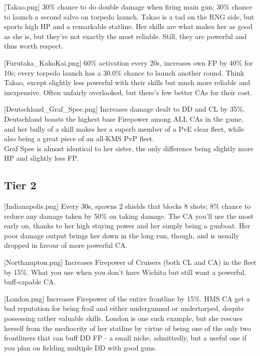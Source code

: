 [Takao.png]
{30\% chance to do double damage when firing main gun; 30\% chance to launch a second salvo on torpedo launch.}
{}
{Takao is a tad on the RNG side, but sports high HP and a remarkable statline. Her skills are what makes her as good as she is, but they're not exactly the most reliable. Still, they are powerful and thus worth respect.}

[Furutaka_KakoKai.png]
{60\% activation every 20s, increases own FP by 40\% for 10s; every torpedo launch has a 30.0\% chance to launch another round.}
{}
{Think Takao, except slightly less powerful with their skills but much more reliable and inexpensive. Often unfairly overlooked, but there's few better CAs for their cost.}

[Deutschland_Graf_Spee.png]
{Increases damage dealt to DD and CL by 35\%.}
{}
{Deutschland boasts the highest base Firepower among ALL CAs in the game, and her bully of a skill makes her a superb member of a PvE clear fleet, while also being a great piece of an all-KMS PvP fleet.\\
Graf Spee is almost identical to her sister, the only difference being slightly more HP and slightly less FP.}
 
 
\newpage
\subsection{Tier 2}
[Indianapolis.png]
{Every 30s, spawns 2 shields that blocks 8 shots; 8\% chance to reduce any damage taken by 50\% on taking damage.}
{}
{The CA you'll use the most early on, thanks to her high staying power and her simply being a gunboat. Her poor damage output brings her down in the long run, though, and is usually dropped in favour of more powerful CA.}
 
[Northampton.png]
{Increases Firepower of Cruisers (both CL and CA) in the fleet by 15\%.}
{}
{What you use when you don't have Wichita but still want a powerful, buff-capable CA.}
 
[London.png]
{Increases Firepower of the entire frontline by 15\%.}
{}
{HMS CA get a bad reputation for being frail and either undergunned or undertorped, despite possessing rather valuable skills. London is one such example, but she rescues herself from the mediocrity of her statline by virtue of being one of the only two frontliners that can buff DD FP - a small niche, admittedly, but a useful one if you plan on fielding multiple DD with good guns.}

